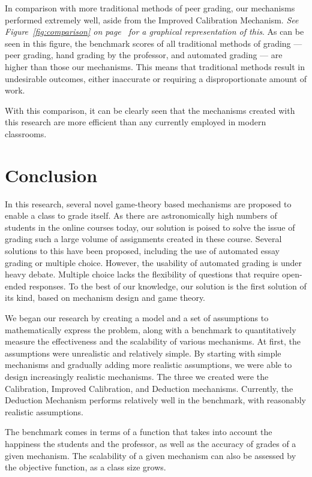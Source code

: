 \documentclass[12pt, Arial]{article}
\begin{document}
In comparison with more traditional methods of peer grading, our mechanisms performed extremely well, aside from the Improved Calibration Mechanism. \emph{See Figure~\ref{fig:comparison} on page~\pageref{fig:comparison} for a graphical representation of this}. As can be seen in this figure, the benchmark scores of all traditional methods of grading --- peer grading, hand grading by the professor, and automated grading --- are higher than those our mechanisms. This means that traditional methods result in undesirable outcomes, either inaccurate or requiring a disproportionate amount of work.

With this comparison, it can be clearly seen that the mechanisms created with this research are more efficient than any currently employed in modern classrooms.

\section{Conclusion}

In this research, several novel game-theory based mechanisms are proposed to enable a class to grade itself. As there are astronomically high numbers of students in the online courses today, our solution is poised to solve the issue of grading such a large volume of assignments created in these course. Several solutions to this have been proposed, including the use of automated essay grading or multiple choice. However, the usability of automated grading is under heavy debate. Multiple choice lacks the flexibility of questions that require open-ended responses. To the best of our knowledge, our solution is the first solution of its kind, based on mechanism design and game theory.

We began our research by creating a model and a set of assumptions to mathematically express the problem, along with a benchmark to quantitatively measure the effectiveness and the scalability of various mechanisms. At first, the assumptions were unrealistic and relatively simple. By starting with simple mechanisms and gradually adding more realistic assumptions, we were able to design increasingly realistic mechanisms. The three we created were the Calibration, Improved Calibration, and Deduction mechanisms. Currently, the Deduction Mechanism performs relatively well in the benchmark, with reasonably realistic assumptions.

The benchmark comes in terms of a function that takes into account the happiness the students and the professor, as well as the accuracy of grades of a given mechanism. The scalability of a given mechanism can also be assessed by the objective function, as a class size grows.
\end{document}
